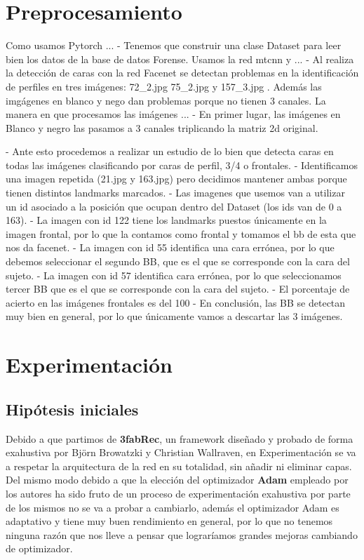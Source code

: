 \section{Preprocesamiento}
    \noindent Como usamos Pytorch ...
        - Tenemos que construir una clase Dataset para leer bien los datos de la base de datos Forense. 
    \noindent Usamos la red mtcnn y ...
        - Al realiza la detección de caras con la red Facenet se detectan problemas en la identificación de perfiles en tres imágenes: 72_2.jpg 75_2.jpg y 157_3.jpg . Además las imgágenes en blanco y nego dan problemas porque no tienen 3 canales.
    \noindent La manera en que procesamos las imágenes ... 
        - En primer lugar, las imágenes en Blanco y negro las pasamos a 3 canales triplicando la matriz 2d original.
        
    - Ante esto procedemos a realizar un estudio de lo bien que detecta caras en todas las imágenes clasificando por caras de perfil, 3/4 o frontales.
    - Identificamos una imagen repetida (21.jpg y 163.jpg) pero decidimos mantener ambas porque tienen distintos landmarks marcados. 
    - Las imagenes que usemos van a utilizar un id asociado a la posición que ocupan dentro del Dataset (los ids van de 0 a 163).
    - La imagen con id 122 tiene los landmarks puestos únicamente en la imagen frontal, por lo que la contamos como frontal y tomamos el bb de esta que nos da facenet.
    - La imagen con id 55 identifica una cara errónea, por lo que debemos seleccionar el segundo BB, que es el que se corresponde con la cara del sujeto.
    - La imagen con id 57 identifica cara errónea, por lo que seleccionamos tercer BB que es el que se corresponde con la cara del sujeto.
    - El porcentaje de acierto en las imágenes frontales es del 100%
    - En conclusión, las BB se detectan muy bien en general, por lo que únicamente vamos a descartar las 3 imágenes.

\section{Experimentación}
    \subsection{Hipótesis iniciales}
    \noindent Debido a que partimos de \textbf{3fabRec}, un framework diseñado y probado de forma exahustiva por Björn Browatzki y Christian Wallraven, en Experimentación se va a respetar la arquitectura de la red en su totalidad, sin añadir ni eliminar capas. Del mismo modo debido a que la elección del optimizador \textbf{Adam} empleado por los autores ha sido fruto de un proceso de experimentación exahustiva por parte de los mismos no se va a probar a cambiarlo, además el optimizador Adam es adaptativo y tiene muy buen rendimiento en general, por lo que no tenemos ninguna razón que nos lleve a pensar que lograríamos grandes mejoras cambiando de optimizador.
    
